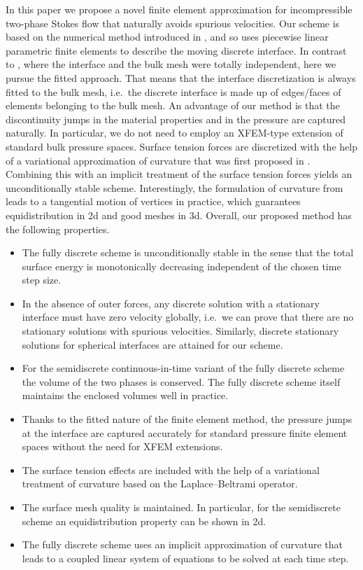 \documentclass[a4paper,12pt,onecolumn]{article}
\begin{document}
In this paper we propose a novel finite element approximation for
incompressible two-phase Stokes flow that naturally avoids spurious
velocities. Our scheme is based on the numerical method introduced in
\cite{spurious}, and so uses piecewise linear parametric finite elements to
describe the moving discrete interface. In contrast to \cite{spurious}, where
the interface and the bulk mesh were totally independent, here we pursue the
fitted approach. That means that the interface discretization is always fitted
to the bulk mesh, i.e.\ the discrete interface is made up of edges/faces of
elements belonging to the bulk mesh. An advantage of our method is that the
discontinuity jumps in the material properties and in the pressure are captured
naturally. In particular, we do not need to employ an XFEM-type extension of
standard bulk pressure spaces. Surface tension forces are discretized with the
help of a variational approximation of curvature that was first proposed in
\cite{triplej,gflows3d}. Combining this with an implicit treatment of the
surface tension forces yields an unconditionally stable scheme. Interestingly,
the formulation of curvature from \cite{triplej} leads to a tangential motion
of vertices in practice, which guarantees equidistribution in 2d and good
meshes in 3d. Overall, our proposed method has the following properties.
\begin{itemize}
\item The fully discrete scheme is unconditionally stable in the sense that the
total surface energy is monotonically decreasing independent of the chosen time
step size.
\item In the absence of outer forces, any discrete solution with a stationary
interface must have zero velocity globally, i.e.\ we can prove that there are
no stationary solutions with spurious velocities. Similarly, discrete
stationary solutions for spherical interfaces are attained for our scheme.
\item For the semidiscrete continuous-in-time variant of the fully discrete
scheme the volume
of the two phases is conserved. The fully discrete scheme itself maintains the
enclosed volumes well in practice.
\item Thanks to the fitted nature of the finite element method, the pressure
jumps at the interface are captured accurately for standard pressure finite
element spaces without the need for XFEM extensions.
\item The surface tension effects are included with the help of a variational
treatment of curvature based on the Laplace--Beltrami operator.
\item The surface mesh quality is maintained. In particular, for the
semidiscrete scheme an equidistribution property can be shown in 2d.
\item The fully discrete scheme uses an implicit approximation of curvature
that leads to a coupled linear system of equations to be solved at each time
step.
\end{itemize}
\end{document}
